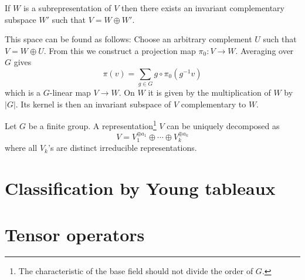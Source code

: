        \begin{property}
        	If $W$ is a subrepresentation of $V$ then there exists an invariant complementary subspace $W'$ such that $V = W \oplus W'$.
            
            This space can be found as follows: Choose an arbitrary complement $U$ such that $V = W \oplus U$. From this we construct a projection map $\pi_0:V \rightarrow W$. Averaging over $G$ gives
            \begin{equation}
            	\pi(v) = \sum_{g\in G}g\circ\pi_0(g^{-1}v)
            \end{equation}
            which is a $G$-linear map $V\rightarrow W$. On $W$ it is given by the multiplication of $W$ by $|G|$. Its kernel is then an invariant subspace of $V$ complementary to $W$.
        \end{property}
        \begin{theorem}[Maschke]
        	Let $G$ be a finite group. A representation\footnote{The characteristic of the base field should not divide the order of $G$.} $V$ can be uniquely decomposed as
		\begin{equation}
	            	V = V_1^{\oplus a_1}\oplus\cdots\oplus V_k^{\oplus a_k}
		\end{equation}
		where all $V_k$'s are distinct irreducible representations.
        \end{theorem}
        
\section{Classification by Young tableaux}

	

\section{Tensor operators}


